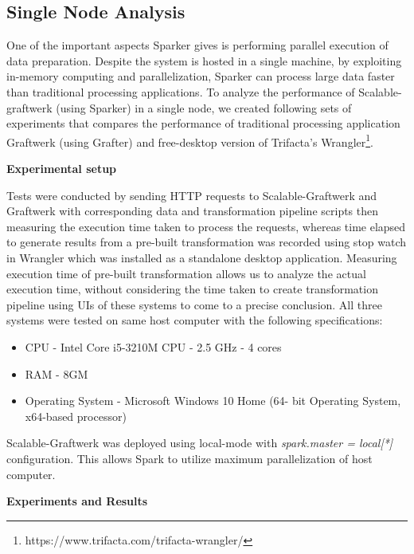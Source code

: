 \subsection{Single Node Analysis}
\label{singlenode}
One of the important aspects Sparker gives is performing parallel execution of data preparation. Despite the system is hosted in a single machine, by exploiting in-memory computing and parallelization, Sparker can process large data faster than traditional processing applications. To analyze the performance of Scalable-graftwerk (using Sparker) in a single node, we created following sets of experiments that compares the performance of traditional processing application Graftwerk (using Grafter) and free-desktop version of Trifacta's Wrangler\footnote{https://www.trifacta.com/trifacta-wrangler/}. 

\textbf{Experimental setup}

Tests were conducted by sending HTTP requests to Scalable-Graftwerk and Graftwerk with corresponding data and transformation pipeline scripts then measuring the execution time taken to process the requests, whereas time elapsed to generate results from a pre-built transformation was recorded using stop watch in Wrangler which was installed as a standalone desktop application. Measuring execution time of pre-built transformation allows us to analyze the actual execution time, without considering the time taken to create transformation pipeline using UIs of these systems to come to a precise conclusion. All three systems were tested on same host computer with the following specifications:
\begin{itemize}
\item CPU - Intel Core i5-3210M CPU - 2.5 GHz - 4 cores
\item RAM - 8GM 
\item Operating System - Microsoft Windows 10 Home (64- bit Operating System, x64-based processor)
\end{itemize}
Scalable-Graftwerk was deployed using local-mode with \textit{ spark.master = local[*]} configuration. This allows Spark to utilize maximum parallelization of host computer.  

\textbf{Experiments and Results}

